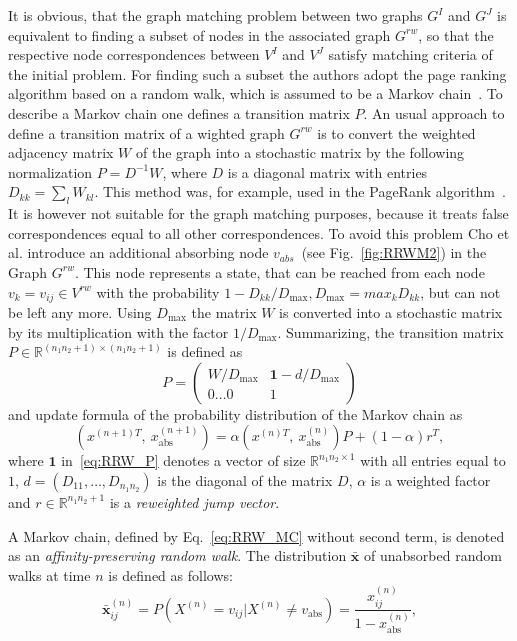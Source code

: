 It is obvious, that the graph matching problem between two graphs $G^I$ and $G^J$ is equivalent to finding a subset of nodes in the associated graph $G^{rw}$, so that the respective node correspondences between $V^I$ and $V^J$ satisfy matching criteria of the initial problem.
For finding such a subset the authors adopt the page ranking algorithm based on a random walk, which is assumed to be a Markov chain~\cite{PageRank}. To describe a Markov chain one defines a transition matrix $P$. An usual approach to define a transition matrix of a wighted graph $G^{rw}$ is to convert the weighted adjacency matrix $W$ of the graph into a stochastic matrix by the following normalization $P=D^{-1}W$, where $D$ is a diagonal matrix with entries $D_{kk}=\sum_{l}{W_{kl}}$. This method was, for example, used in the PageRank algorithm~\cite{PageRank}. It is however not suitable for the graph matching purposes, because it treats false correspondences equal to all other correspondences. To avoid this problem Cho et al. introduce an additional absorbing node $v_{abs}$~(see Fig.~\ref{fig:RRWM2}) in the Graph $G^{rw}$. This node represents a state, that can be reached from each node $v_k=v_{ij}\in V^{rw}$ with the probability $1-D_{kk}/D_{\text{max}}, D_{\text{max}}=max_{k}D_{kk}$, but can not be left any more. Using $D_\text{max}$ the matrix $W$ is converted into a stochastic matrix by its multiplication with the factor $1/D_{\text{max}}$.
Summarizing, the transition matrix $P\in\mathbb{R}^{(n_1n_2+1)\times(n_1n_2+1)}$ is defined as 
\begin{equation}P=
\begin{pmatrix}
W/D_{\text{max}} & \mathbf{1}-d/D_{\text{max}} \\
0\dots 0 & 1
\end{pmatrix} \label{eq:RRW_P}
\end{equation}
and update formula of the probability distribution of the Markov chain as
\begin{equation}\label{eq:RRW_MC}
\left(x^{(n+1)T},\ x_{\text{abs}}^{(n+1)}\right)=\alpha\left(x^{(n)T},\ x_{\text{abs}}^{(n)}\right)P+(1-\alpha)r^T,
\end{equation}
where $\mathbf{1}$ in~\eqref{eq:RRW_P} denotes a vector of size $\mathbb{R}^{n_1n_2\times 1}$ with all entries equal to $1$, $d=(D_{11},\dots,D_{n_1n_2})$ is the diagonal of the matrix $D$, $\alpha$ is a weighted factor and $r\in\mathbb{R}^{n_1n_2+1}$ is a \emph{reweighted jump vector}.

A Markov chain, defined by Eq.~\ref{eq:RRW_MC} without second term, is denoted as an \emph{affinity-preserving random walk}. The distribution $\mathbf{\bar{x}}$ of unabsorbed random walks at time $n$ is defined as follows:
\begin{equation}\label{eq:RRWM_x}
\mathbf{\bar{x}}^{(n)}_{ij}=P(X^{(n)}=v_{ij}|X^{(n)}\not=v_{\text{abs}})=\frac{x^{(n)}_{ij}}{1-x^{(n)}_{\text{abs}}}, 
\end{equation}

